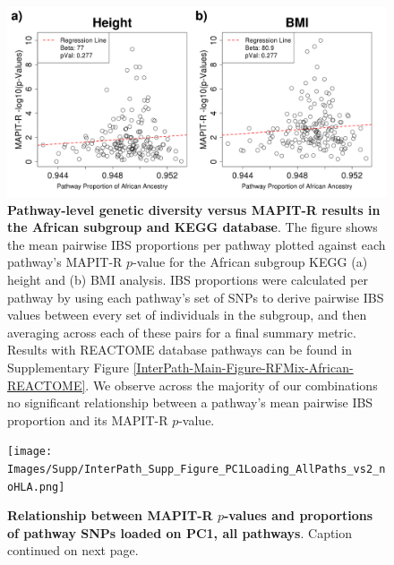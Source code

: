 \documentclass[12pt,a4paper]{article}
\begin{document}
\begin{figure}[htbp]
\centering
\includegraphics[scale=.35]{Images/Supp/InterPath_Supp_Figure_RFMix_vs2_African_KEGG_noHLA.png}
\caption[TBD]{\textbf{Pathway-level genetic diversity versus MAPIT-R results in the African subgroup and KEGG database}. The figure shows the mean pairwise IBS proportions per pathway plotted against each pathway's MAPIT-R $p$-value for the African subgroup KEGG (a) height and (b) BMI analysis. IBS proportions were calculated per pathway by using each pathway's set of SNPs to derive pairwise IBS values between every set of individuals in the subgroup, and then averaging across each of these pairs for a final summary metric. Results with REACTOME database pathways can be found in Supplementary Figure \ref{InterPath-Main-Figure-RFMix-African-REACTOME}. We observe across the majority of our combinations no significant relationship between a pathway's mean pairwise IBS proportion and its MAPIT-R $p$-value.}
\label{InterPath-Supp-Figure-RFMix-African-KEGG}
\end{figure}
\clearpage

\setlength{\footskip}{3cm}
\begin{figure}[htbp]
\centering
\vspace*{-2cm}
\texttt{[image: Images/Supp/InterPath\_Supp\_Figure\_PC1Loading\_AllPaths\_vs2\_noHLA.png]}
\caption[TBD]{\textbf{Relationship between MAPIT-R $p$-values and proportions of pathway SNPs loaded on PC1, all pathways}. Caption continued on next page.}
\label{InterPath-Supp-Figure-PC1Loading-AllPaths}
\end{figure}
\clearpage
\setlength{\footskip}{1cm}
\end{document}

